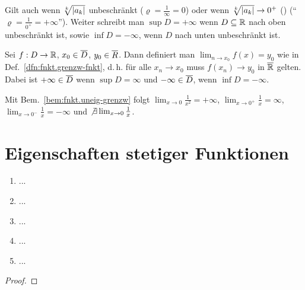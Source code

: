 \documentclass[12pt]{scrreprt}
\begin{document}
\noindent Gilt auch wenn $\sqrt[k]{\left\lvert a_k\right\lvert}$ unbeschränkt ($\varrho = \frac{1}{\infty} = 0$) oder wenn $\sqrt[k]{\left\lvert a_k\right\lvert} \to 0^+$ (\kinf)
("`$\varrho = \frac{1}{0^+} = +\infty$"'). Weiter schreibt man $\sup D = +\infty$ wenn $D\subseteq\mathbb{R}$ nach oben unbeschränkt
ist, sowie $\inf D= -\infty$, wenn $D$ nach unten unbeschränkt ist.

Sei $f: D\rightarrow\mathbb{R}$, $x_0\in\overline{D}$, $y_0\in\overline{R}$. Dann definiert man $\lim_{n\to x_0} f(x) = y_0$ wie in Def.~\ref{dfn:fnkt.grenzw-fnkt},
d.\,h. für alle $x_n \to x_0$ muss $f(x_n)\to y_0$ in $\overline{\mathbb{R}}$ gelten. Dabei ist $+\infty\in\overline{D}$ wenn $\sup D = \infty$ und
$-\infty \in \overline{D}$, wenn $\inf D = -\infty$.

\begin{bsp*}
Mit Bem.~\ref{bem:fnkt.uneig-grenzw} folgt $\lim_{x\to 0}\frac{1}{x^2} = +\infty$, $\lim_{x\to 0^+}\frac{1}{x} = \infty$,
$\lim_{x\to 0^-}\frac{1}{x} = -\infty$ und $\not\exists\lim_{x\to 0}\frac{1}{x}$.
\end{bsp*}

\section{Eigenschaften stetiger Funktionen}
\label{sec:fnkt.stetige-fnkt}

\begin{dfn}\label{dfn:fnkt.stetigkeit}

\end{dfn}

\begin{bsp}\label{bsp:fnkt.stetigkeit}
\begin{enumerate}
\item ...\label{bsp:fnkt.stetigkeit.a}
\item ...\label{bsp:fnkt.stetigkeit.b}
\item ...\label{bsp:fnkt.stetigkeit.c}
\item ...\label{bsp:fnkt.stetigkeit.d}
\item ...\label{bsp:fnkt.stetigkeit.e}
\end{enumerate}
\end{bsp}

\begin{dfn*}

\end{dfn*}

\begin{satz}\label{satz:fnkt.uebertragung-stetigk}

\end{satz}
\begin{proof}

\end{proof}
\end{document}
